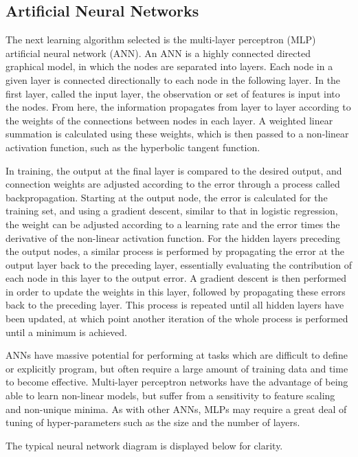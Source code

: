 \subsection{Artificial  Neural Networks}

The next learning algorithm selected is the multi-layer perceptron (MLP) artificial neural network (ANN).
An ANN is a highly connected directed graphical model, in which the nodes are separated into layers.
Each node in a given layer is connected directionally to each node in the following layer.
In the first layer, called the input layer, the observation or set of features is input into the nodes.
From here, the information propagates from layer to layer according to the weights of the connections between nodes in each layer.
A weighted linear summation is calculated using these weights, which is then passed to a non-linear activation function, such as the hyperbolic tangent function.


In training, the output at the final layer is compared to the desired output, and connection weights are adjusted according to the error through a process called backpropagation.
Starting at the output node, the error is calculated for the training set, and using a gradient descent, similar to that in logistic regression, the weight can be adjusted according to a learning rate and the error times the derivative of the non-linear activation function.
For the hidden layers preceding the output nodes, a similar process is performed by propagating the error at the output layer back to the preceding layer, essentially evaluating the contribution of each node in this layer to the output error.
A gradient descent is then performed in order to update the weights in this layer, followed by propagating these errors back to the preceding layer.
This process is repeated until all hidden layers have been updated, at which point another iteration of the whole process is performed until a minimum is achieved.


ANNs have massive potential for performing at tasks which are difficult to define or explicitly program, but often require a large amount of training data and time to become effective.
Multi-layer perceptron networks have the advantage of being able to learn non-linear models, but suffer from a sensitivity to feature scaling and non-unique minima.
As with other ANNs, MLPs may require a great deal of tuning of hyper-parameters such as the size and the number of layers.

The typical neural network diagram is displayed below for clarity.

